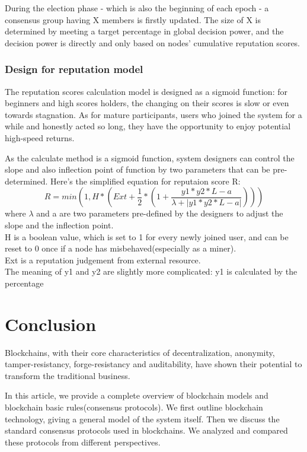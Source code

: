 \documentclass[doublespacing]{bmcart}
\begin{document}
\begin{CJK*}{UTF8}{gbsn}
	During the election phase - which is also the beginning of each epoch - a consensus group having X members is firstly updated. The size of X is determined by meeting a target percentage in global decision power, and the decision power is directly and only based on nodes' cumulative reputation scores.
	\subsubsection*{Design for reputation model}
	The reputation scores calculation model is designed as a sigmoid function: for beginners and high scores holders, the changing on their scores is slow or even towards stagnation. As for mature participants, users who joined the system for a while and honestly acted so long, they have the opportunity to enjoy potential high-speed returns.
	
	As the calculate method is a sigmoid function, system designers can control the slope and also inflection point of function by two parameters that can be pre-determined. Here's the simplified equation for reputaion score R:
	\begin{equation}
	R = min(1, H * (Ext + \frac{1}{2}*(1+\frac{y1*y2*L-a}{\lambda+|y1*y2*L-a|}) ))
	\end{equation}
where $\lambda$ and a are two parameters pre-defined by the designers to adjust the slope and the inflection point.	
\\H is a boolean value, which is set to 1 for every newly joined user, and can be reset to 0 once if a node has misbehaved(especially as a miner).
\\Ext is a reputation judgement from external resource. 
\\The meaning of y1 and y2 are slightly more complicated: y1 is calculated by the percentage 
	
	
	\section{Conclusion}
	Blockchains, with their core characteristics of decentralization, anonymity, tamper-resistancy, forge-resistancy and auditability, have shown their potential to transform the traditional business. 
		
	In this article, we provide a complete overview of blockchain models and blockchain basic rules(consensus protocols). We first outline blockchain technology, giving a general model of the system itself. Then we discuss the standard consensus protocols used in blockchains. We analyzed and compared these protocols from different perspectives. 
	

\end{CJK*}
\end{document}
